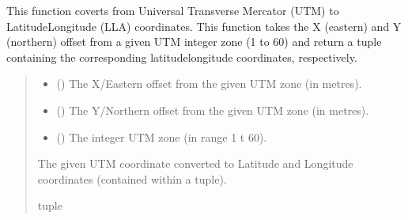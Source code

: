 \documentclass[letterpaper,10pt,english]{sphinxmanual}
\begin{document}
\begin{fulllineitems}
\label{\detokenize{modules/earth/utm:qnav.earth.utm.utm2lla}}
\pysigstartsignatures
{}
\pysigstopsignatures
\sphinxAtStartPar
This function coverts from Universal Transverse Mercator (UTM) to
Latitude\sphinxhyphen{}Longitude (LLA) coordinates. This function takes the X (eastern)
and Y (northern) offset from a given UTM integer zone (1 to 60) and
return a tuple containing the corresponding latitude\sphinxhyphen{}longitude
coordinates, respectively.
\begin{quote}\begin{description}
\begin{itemize}
\item {} 
\sphinxAtStartPar
{} () \textendash{} The X/Eastern offset from the given UTM zone (in metres).

\item {} 
\sphinxAtStartPar
{} () \textendash{} The Y/Northern offset from the given UTM zone (in metres).

\item {} 
\sphinxAtStartPar
{} () \textendash{} The integer UTM zone (in range 1 t 60).

\end{itemize}

\sphinxAtStartPar
The given UTM coordinate converted to Latitude and Longitude
coordinates (contained within a tuple).

\sphinxAtStartPar
tuple

\end{description}\end{quote}

\end{fulllineitems}
\end{document}
